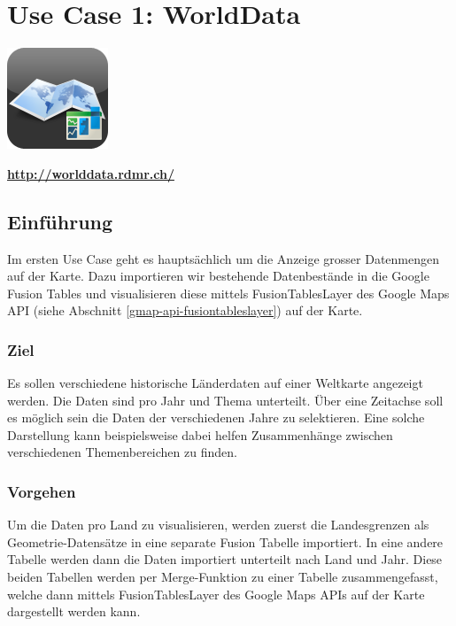 \chapter{Use Case 1: WorldData}
\label{worlddata}

\begin{center}
\includegraphics[scale=0.8]{images/usecase1-worlddata/worlddata-icon_with_gloss.png}

{\large \textbf{\url{http://worlddata.rdmr.ch/}}}
\end{center}

\section{Einführung}
Im ersten Use Case geht es hauptsächlich um die Anzeige grosser Datenmengen auf der Karte. Dazu importieren wir bestehende Datenbestände in die Google Fusion Tables und visualisieren diese mittels FusionTablesLayer des Google Maps API (siehe Abschnitt \ref{gmap-api-fusiontableslayer}) auf der Karte.

\subsection{Ziel}
Es sollen verschiedene historische Länderdaten auf einer Weltkarte angezeigt werden. Die Daten sind pro Jahr und Thema unterteilt. Über eine Zeitachse soll es möglich sein die Daten der verschiedenen Jahre zu selektieren. Eine solche Darstellung kann beispielsweise dabei helfen Zusammenhänge zwischen verschiedenen Themenbereichen zu finden.

\subsection{Vorgehen}
Um die Daten pro Land zu visualisieren, werden zuerst die Landesgrenzen als Geometrie-Datensätze in eine separate Fusion Tabelle importiert. In eine andere Tabelle werden dann die Daten importiert unterteilt nach Land und Jahr. Diese beiden Tabellen werden per Merge-Funktion zu einer Tabelle zusammengefasst, welche dann mittels FusionTablesLayer des Google Maps APIs auf der Karte dargestellt werden kann.

